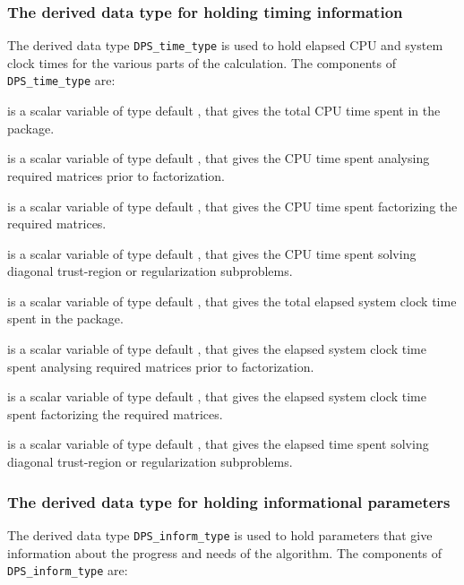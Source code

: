 \documentclass{galahad}
\newcommand{\packagename}{DPS}
\begin{document}
\subsubsection{The derived data type for holding timing
 information}\label{typetime}
The derived data type
{\tt \packagename\_time\_type}
is used to hold elapsed CPU and system clock times for the various parts of
the calculation. The components of
{\tt \packagename\_time\_type}
are:
\begin{description}
 is a scalar variable of type default \realdp, that gives
 the total CPU time spent in the package.

 is a scalar variable of type default \realdp, that gives
 the CPU time spent analysing required matrices prior to factorization.

 is a scalar variable of type default \realdp, that gives
 the CPU time spent factorizing the required matrices.

 is a scalar variable of type default \realdp, that gives
 the CPU time spent solving diagonal trust-region or regularization subproblems.

 is a scalar variable of type default \realdp, that gives
 the total elapsed system clock time spent in the package.

 is a scalar variable of type default \realdp, that gives
 the elapsed system clock time spent analysing required matrices prior to
factorization.

 is a scalar variable of type default \realdp, that gives
 the elapsed system clock time spent factorizing the required matrices.

 is a scalar variable of type default \realdp,
 that gives the elapsed time spent solving diagonal trust-region or
 regularization subproblems.

\end{description}


\subsubsection{The derived data type for holding informational
 parameters}\label{typeinform}
The derived data type
{\tt \packagename\_inform\_type}
is used to hold parameters that give information about the progress and needs
of the algorithm. The components of
{\tt \packagename\_inform\_type}
are:
\end{document}
